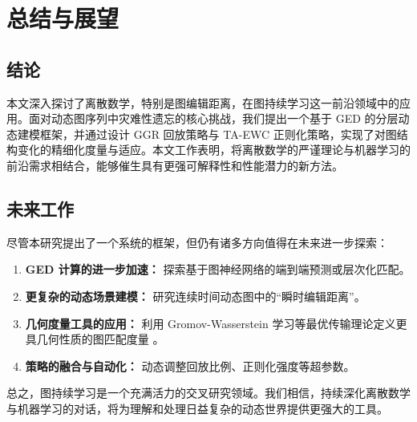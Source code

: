 \chapter{总结与展望}
\section{结论}
本文深入探讨了离散数学，特别是图编辑距离，在图持续学习这一前沿领域中的应用。面对动态图序列中灾难性遗忘的核心挑战，我们提出一个基于 GED 的分层动态建模框架，并通过设计 GGR 回放策略与 TA-EWC 正则化策略，实现了对图结构变化的精细化度量与适应。本文工作表明，将离散数学的严谨理论与机器学习的前沿需求相结合，能够催生具有更强可解释性和性能潜力的新方法。

\section{未来工作}
尽管本研究提出了一个系统的框架，但仍有诸多方向值得在未来进一步探索：

\begin{enumerate}[label=\arabic*.]
  \item \textbf{GED 计算的进一步加速：} 探索基于图神经网络的端到端预测或层次化匹配。
  \item \textbf{更复杂的动态场景建模：} 研究连续时间动态图中的“瞬时编辑距离”。
  \item \textbf{几何度量工具的应用：} 利用 Gromov-Wasserstein 学习等最优传输理论定义更具几何性质的图匹配度量 \cite{xu2019gromov}。
  \item \textbf{策略的融合与自动化：} 动态调整回放比例、正则化强度等超参数。
\end{enumerate}

总之，图持续学习是一个充满活力的交叉研究领域。我们相信，持续深化离散数学与机器学习的对话，将为理解和处理日益复杂的动态世界提供更强大的工具。


